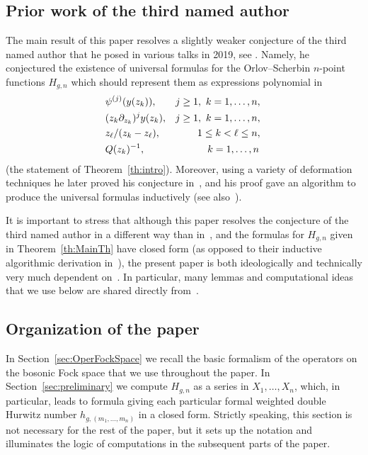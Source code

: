 \documentclass[JEP,XML,SOM,Unicode,NoEqCountersInSection,NoFloatCountersInSection]{cedram}
\theoremstyle{plain}
\theoremstyle{definition}
\theoremstyle{remark}
\begin{document}
\subsection{Prior work of the third named author} The main result of this paper resolves a slightly weaker conjecture of the third named author that he posed in various talks in 2019, see \eg \cite{Kaz2019}. Namely, he conjectured the existence of universal formulas for the Orlov--Scherbin $n$-point functions $H_{g,n}$ which should represent them as expressions polynomial in
\begin{align*}
\hspace*{3cm}& \psi^{(j)}(y(z_k)), & j\geq 1,\ k=1,\dots, n,\hspace*{3cm}\mbox{} \\
& (z_k\partial_{z_k})^j y(z_k), & j\geq 1,\ k=1,\dots, n,\hspace*{3cm}\mbox{} \\
& z_\ell/(z_k-z_\ell), & 1\leq k < \ell \leq n,\hspace*{3cm}\mbox{} \\
& Q(z_k)^{-1}, & k=1,\dots,n\hphantom{,}\hspace*{3cm}\mbox{}
\end{align*}
(\cf the statement of Theorem~\ref{th:intro}).
Moreover, using a variety of deformation techniques he later proved his conjecture in~\cite{Kaz2020}, and his proof gave an algorithm to produce the universal formulas inductively (see also~\cite{Kaz2020a}).

It is important to stress that although this paper resolves the conjecture of the third named author in a different way than in~\cite{Kaz2020}, and the formulas for $H_{g,n}$ given in Theorem~\ref{th:MainTh} have closed form (as opposed to their inductive algorithmic derivation in~\cite{Kaz2020}), the present paper is both ideologically and technically very much dependent on~\cite{Kaz2020}. In particular, many lemmas and computational ideas that we use below are shared directly from~\cite{Kaz2020}.

\subsection{Organization of the paper} In Section~\ref{sec:OperFockSpace} we recall the basic formalism of the operators on the bosonic Fock space that we use throughout the paper. In Section~\ref{sec:preliminary} we compute $H_{g,n}$ as a series in $X_1,\dots,X_n$, which, in particular, leads to formula giving
each particular formal weighted double Hurwitz number $h_{g,(m_1,\dots,m_n)}$ in a closed form. Strictly speaking, this section is not necessary for the rest of the paper, but it sets up the notation and illuminates the logic of computations in the subsequent parts of the paper.
\end{document}

